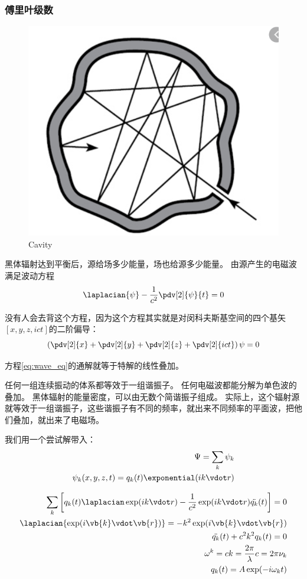 
\subsubsection{傅里叶级数}%

\begin{figure}[h]
	\centering
	\includegraphics[width=0.2\linewidth]{figures/cavity.png}
	\caption{Cavity}%
	\label{fig:cavity}
\end{figure}

黑体辐射达到平衡后，源给场多少能量，场也给源多少能量。
由源产生的电磁波满足波动方程
\begin{equation}
	\label{eq:wave_eq}
	\laplacian{\psi} - \frac{1}{c^2} \pdv[2]{\psi}{t}=0
\end{equation}

\begin{note}
没有人会去背这个方程，因为这个方程其实就是对闵科夫斯基空间的四个基矢$[x,y,z,ict]$的二阶偏导：
\[
	\left(\pdv[2]{x} +\pdv[2]{y} +\pdv[2]{z} +\pdv[2]{ict} \right)\psi = 0
\]
\end{note}

方程\eqref{eq:wave_eq}的通解就等于特解的线性叠加。

任何一组连续振动的体系都等效于一组谐振子。
任何电磁波都能分解为单色波的叠加。
黑体辐射的能量密度，可以由无数个简谐振子组成。
实际上，这个辐射源就等效于一组谐振子，这些谐振子有不同的频率，就出来不同频率的平面波，把他们叠加，就出来了电磁场。

我们用一个尝试解带入：
\begin{equation}
	\begin{aligned}
		\label{eq:superposition}
			\Psi = \sum_{k} \psi_k  \\
			\psi_k(x,y,z,t)=q_k(t)\exponential(ik\vdot r)
	\end{aligned}
\end{equation}

\begin{align*}
	\sum_{k} \left[ q_k(t) \laplacian \exp(ik\vdot r) - \frac{1}{c^2} \exp(ik \vdot r) \ddot{q_k}(t) \right] = 0 \\
	\laplacian{\exp(i\vb{k}\vdot\vb{r})} = - k^2 \exp(i\vb{k}\vdot\vb{r}) \\ 
	\ddot{q_k}(t)+c^2 k^2 q_k(t) = 0\\
	\omega^k=ck= \frac{2\pi}{\lambda}c=2\pi \nu_k\\
	q_k(t)=A\exp(-i \omega_k t)
\end{align*}

